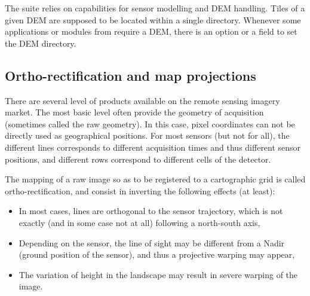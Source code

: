 The \otb suite relies on \ossim capabilities for sensor modelling and
DEM handling. Tiles of a given DEM are supposed to be located within a
single directory. Whenever some applications or modules from
\mont require a DEM, there is an option or a field to set the DEM
directory.

%
%
%
%
%



\subsection{Ortho-rectification and map projections}\label{ssec:ortho}

There are several level of products available on the remote sensing
imagery market. The most basic level often provide the geometry of
acquisition (sometimes called the raw geometry). In this case, pixel
coordinates can not be directly used as geographical positions. For
most sensors (but not for all), the different lines corresponds to
different acquisition times and thus different sensor positions, and
different rows correspond to different cells of the detector.

The mapping of a raw image so as to be registered to a cartographic
grid is called ortho-rectification, and consist in inverting the
following effects (at least):
\begin{itemize}
\item In most cases, lines are orthogonal to the sensor trajectory,
 which is not exactly (and in some case not at all) following a
 north-south axis,
\item Depending on the sensor, the line of sight may be different from
  a Nadir (ground position of the sensor), and thus a projective
  warping may appear,
\item The variation of height in the landscape may result in severe
  warping of the image.
\end{itemize}

